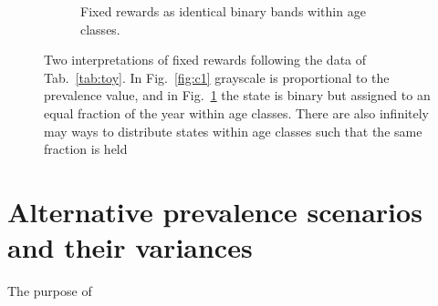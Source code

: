 \documentclass{bmcart}
\begin{document}
\begin{figure}
\begin{subfigure}[b]{0.4\textwidth}
        \caption{Fixed rewards as identical binary bands within age classes.}
        \label{fig:c2}
    \end{subfigure}
    \caption{Two interpretations of fixed rewards following the data of Tab.~\ref{tab:toy}. In Fig.~\ref{fig:c1} grayscale is proportional to the prevalence value, and in Fig.~\ref{fig:c2} the state is binary but assigned to an equal fraction of the year within age classes. There are also infinitely may ways to distribute states within age classes such that the same fraction is held}
    \label{fig:fixedexplain}
\end{figure}
\FloatBarrier

\section{Alternative prevalence scenarios and their variances}
The purpose of 

\pagebreak

\end{document}
